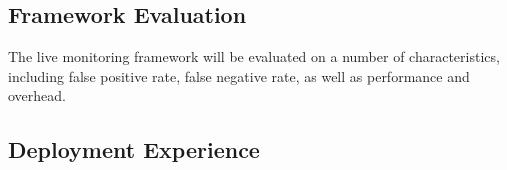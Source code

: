 \subsection{Framework Evaluation}
The live monitoring framework will be evaluated on a number of characteristics, including false positive rate, false negative rate, as well as performance and overhead.

\subsection{Deployment Experience}
